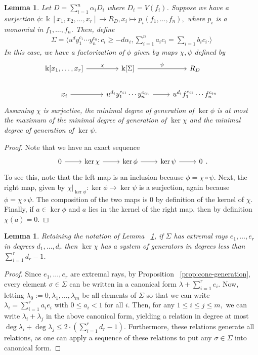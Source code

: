\documentclass{amsart}
\theoremstyle{plain}
\newtheorem{lem}[thm]{Lemma}
\theoremstyle{definition}
\theoremstyle{remark}
\numberwithin{equation}{section}
\newcommand\bk{{\Bbbk}}
\begin{document}
\begin{lem}
\label{lem:composite-map}
Let $D = \sum_{i=1}^{n}\alpha_i D_i$ where $D_i = V(f_i)$. Suppose we have a surjection $\phi: \bk[x_1,x_2,\ldots, x_r] \rightarrow R_D, x_i \mapsto p_i(f_1, \ldots, f_n),$ where $p_i$ is a monomial in $f_1,\ldots, f_n$. Then, define
\begin{align*}
	\Sigma = \langle u^d y_1^{c_1} \cdots y_n^{c_n} : c_i \geq -d \alpha_i, \sum_{i=1}^{n}a_ic_i = \sum_{i=1}^{} b_i c_i. \rangle 
\end{align*}
In this case, we have a factorization of $\phi$ given by maps $\chi, \psi$ defined by
$$\begin{tikzcd}
\bk[x_1,\ldots, x_r] \ar {r}{\chi} & \bk[\Sigma] \ar {r}{\psi} & R_D \\
x_i \ar r & u^{d_i}y_1^{c_{i1}} \cdots y_n^{c_{in}} \ar r & u^{d_i}f_1^{c_{i1}} \cdots f_n^{c_{in}}
\end{tikzcd}$$
Assuming $\chi$ is surjective, the minimal degree of generation of $\ker \phi$ is at most the maximum of the minimal degree of generation of $\ker \chi$ and the minimal degree of generation of $\ker \psi$.
\end{lem}
\begin{proof}
Note that we have an exact sequence
$$\begin{tikzcd}
0 \ar r & \ker \chi \ar r & \ker \phi \ar r & \ker \psi \ar r & 0
\end{tikzcd}.$$
To see this, note that the left map is an inclusion because $\phi = \chi \circ \psi$. Next, the right map, given by $\chi|_{\ker \phi}:\ker \phi \rightarrow \ker \psi$ is a surjection, again because $\phi = \chi \circ \psi$. The composition of the two maps is $0$ by definition of the kernel of $\chi$. Finally, if $a \in \ker \phi$ and $a$ lies in the kernel of the right map, then by definition $\chi(a) = 0$.
\end{proof}

\begin{lem}
\label{lem:bound-ker-chi}
Retaining the notation of Lemma ~\ref{lem:composite-map}, if $\Sigma$ has extremal rays $e_1,\ldots, e_r$ in degrees $d_1, \ldots, d_r$ then $\ker \chi$ has a system of generators in degrees less than $\sum_{i=1}^{r}d_r-1$.
\end{lem}
\begin{proof}
Since $e_1, \ldots, e_r$ are extremal rays, by Proposition ~\ref{prop:cone-generation}, every element $\sigma \in \Sigma$ can be written in a canonical form $\lambda + \sum_{i=1}^{r}e_i$. Now, letting $\lambda_0 := 0,\lambda_1, \ldots, \lambda_m$ be all elements of $\Sigma$ so that we can write $\lambda_i = \sum_{i=1}^{r}a_i e_i$ with $0 \leq a_i < 1$ for all $i$. Then, for any $1 \leq i \leq j \leq m,$ we can write $\lambda_i + \lambda_j$ in the above canonical form, yielding a relation in degree at most $\deg \lambda_i + \deg \lambda_j \leq 2 \cdot \left( \sum_{i=1}^{r}d_r -1 \right).$ Furthermore, these relations generate all relations, as one can apply a sequence of these relations to put any $\sigma \in \Sigma$ into canonical form.
\end{proof}
\end{document}

